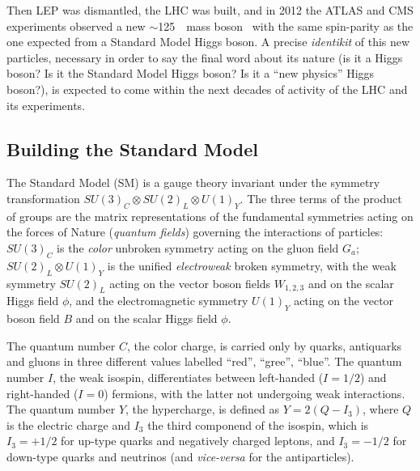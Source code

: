 Then LEP was dismantled, the LHC was built, and in 2012 
the ATLAS and CMS experiments
observed a new $\sim$125~\gev\ mass boson~\cite{2012gk,Chatrchyan201230}
with the same spin-parity as the one expected from a Standard Model
Higgs boson. A precise {\it identikit} of this new particles, necessary
in order to say the final word about its nature (is it a Higgs boson?
Is it the Standard Model Higgs boson? Is it a ``new physics'' Higgs boson?),
is expected to come within the next decades of activity of the LHC and its
experiments.


\subsection{Building the Standard Model}\label{sec:THsm}

The Standard Model (SM) is a gauge theory invariant under the symmetry 
transformation $SU(3)_{C} \otimes SU(2)_{L} \otimes U(1)_{Y}$. The
three terms of the product of groups are the matrix representations
of the fundamental symmetries acting on the forces of Nature ({\it quantum fields})
governing the interactions of particles: 
$SU(3)_{C}$ is the {\it color} unbroken 
symmetry %
 acting on the gluon field $G_a$; 
$SU(2)_{L} \otimes U(1)_{Y}$ is the unified {\it electroweak} broken 
symmetry, %
with the weak symmetry $SU(2)_{L}$
acting on the vector boson fields $W_{1,2,3}$ and on the scalar Higgs field $\phi$,
and the electromagnetic symmetry $U(1)_{Y}$ %
acting on the vector boson field $B$ and on the scalar Higgs field $\phi$.

The quantum number $C$, the color charge, is carried only by
quarks, antiquarks and gluons 
in three different values labelled ``red'', ``gree'', ``blue''.
The quantum number $I$, the weak isospin, differentiates between left-handed
($I=1/2$) and right-handed ($I=0$) fermions, with the latter not undergoing weak interactions.
The quantum number $Y$, the hypercharge, is defined as $Y=2(Q-I_3)$, 
where $Q$ is the electric charge and $I_3$ the third componend of the isospin,
which is $I_3=+1/2$ for up-type quarks and negatively charged leptons, and
 $I_3=-1/2$ for down-type quarks and neutrinos (and {\it vice-versa} for the antiparticles).

